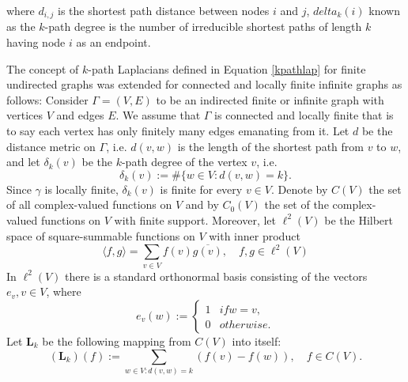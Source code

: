 \documentclass[10pt,a4paper]{article}
\begin{document}
    	    where $d_{i,j}$ is the shortest path distance between nodes $i$ and $j$, $delta_{k}(i)$ known as the $k$-path degree is the number of irreducible shortest paths of length $k$ having node $i$ as an endpoint.
    	    
    	    The concept of $k$-path Laplacians defined in Equation \ref{kpathlap} for finite undirected graphs was extended for connected and locally finite infinite graphs as follows:
    	    Consider $\Gamma = (V,E)$ to be an indirected finite or infinite graph with vertices $V$ and edges $E$. We assume that $\Gamma$ is connected and locally finite that is to say each vertex has only finitely many edges emanating from it. Let $d$ be the distance metric on $\Gamma$, i.e. $d(v,w)$ is the length of the shortest path from $v$ to $w$, and let $\delta_{k}(v)$ be the $k$-path degree of the vertex $v$, i.e.
    	    \begin{equation}
    	    \delta_{k}(v) := \#\{w \in V : d(v,w) = k\}.
    	    \end{equation}
    	    Since $\gamma$ is locally finite, $\delta_{k}(v)$ is finite for every $v \in V$. Denote by $C(V)$ the set of all complex-valued functions on $V$ and by $C_{0}(V)$ the set of the complex-valued functions on $V$ with finite support. Moreover, let $\ell^2(V)$ be the Hilbert space of square-summable functions on $V$ with inner product
    	    \begin{equation}
    	    \langle f,g\rangle = \sum_{v\in V} f(v) \overline{g(v)}, \quad f,g \in \ell^2(V) 
    	    \end{equation}
    	    In $\ell^2(V)$ there is a standard orthonormal basis consisting of the vectors $e_v, v\in V$, where
    	    \begin{equation}
    	    e_v(w) :=  \begin{cases*}
    	    1 & if  w = v,  \\
    	    0 & otherwise.
    	    \end{cases*}
    	    \end{equation}
    	    Let $\mathbf{L}_{k}$ be the following mapping from $C(V)$ into itself:
    	    \begin{equation}
    	    (\mathbf{L}_{k}) (f) := \sum_{w\in V: d(v,w)=k} (f(v) -f(w)), \quad f \in C(V).
    	    \label{infinite-dif}
    	    \end{equation}
    	    
\end{document}
